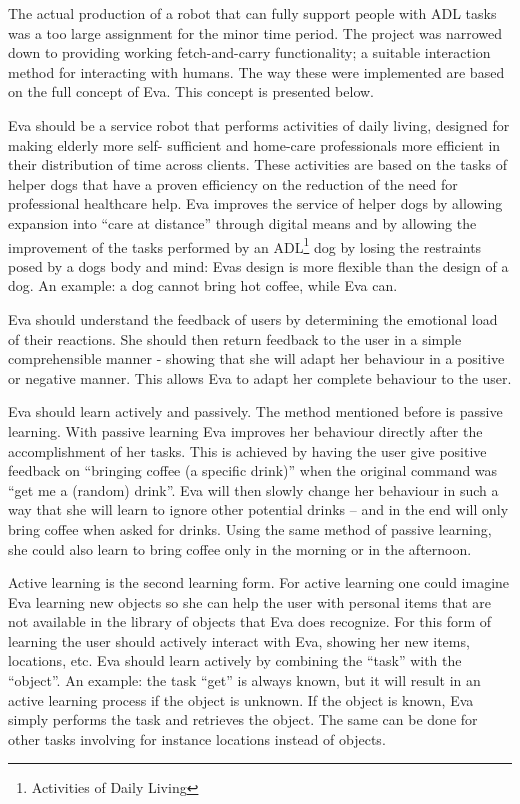 \documentclass[project_eva.tex]{subfiles}
\begin{document}
The actual production of a robot that can fully support people with ADL tasks was a too large assignment for the minor time period. The project was narrowed down to providing working fetch-and-carry functionality; a suitable interaction method for interacting with humans. The way these were implemented are based on the full concept of Eva. This concept is presented below.

Eva should be a service robot that performs activities of daily living, designed for making elderly more self-
sufficient\cite{Forlizzi} and home-care professionals more efficient in their distribution of time across clients. These 
activities are based on the tasks of helper dogs that have a proven efficiency on the reduction of the need for 
professional healthcare help\cite{Diepenhorst}. Eva improves the service of helper dogs by allowing 
expansion into ``care at distance'' \cite{Evers} through digital means and by allowing the improvement of the tasks 
performed by an ADL\footnote{Activities of Daily Living} dog by losing the restraints posed by a dog\textquotesingle s body and mind: Eva\textquotesingle s design is more flexible than the 
design of a dog. An example: a dog cannot bring hot coffee, while Eva can.

Eva should understand the feedback of users by determining the emotional load of their reactions. She should then return 
feedback to the user in a simple comprehensible manner - showing that she will adapt her behaviour in a positive or 
negative manner. This allows Eva to adapt her complete behaviour to the user.

Eva should learn actively and passively. The method mentioned before is passive learning. With passive learning Eva 
improves her behaviour directly after the accomplishment of her tasks. This is achieved by having the user give positive 
feedback on ``bringing coffee (a specific drink)''  when the original command was ``get me a (random) drink''.  Eva will 
then slowly change her behaviour in such a way that she will learn to ignore other potential drinks – and in the end will 
only bring coffee when asked for drinks. Using the same method of passive learning, she could also learn to bring coffee 
only in the morning or in the afternoon.

\label{sec:Concept}
Active learning is the second learning form. For active learning one could imagine Eva learning new objects so 
she can help the user with personal items that are not available in the library of objects that Eva does recognize. 
For this form of learning the user should actively interact with Eva, showing her new items, locations, etc. Eva should 
learn actively by combining the ``task'' with the ``object''. An example: the task ``get'' is always known, but it will 
result in an active learning process if the object is unknown. If the object is known, Eva simply performs the task and 
retrieves the object. The same can be done for other tasks involving for instance locations instead of objects.
\end{document}
